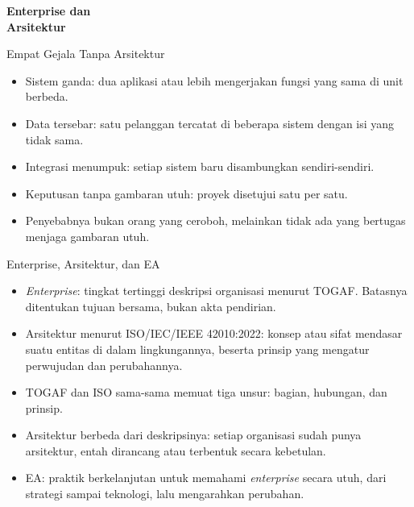 \documentclass[aspectratio=169, table, 12pt]{beamer}
\begin{document}
\begin{frame}{\hfill}
  \centering
  \Huge{\textbf{Enterprise dan\\Arsitektur}}
\end{frame}

\begin{frame}{{\Large Empat Gejala Tanpa Arsitektur}}
  \vspace{10pt}
  \begin{itemize}
    \item Sistem ganda: dua aplikasi atau lebih mengerjakan fungsi yang sama di unit berbeda.
    \item Data tersebar: satu pelanggan tercatat di beberapa sistem dengan isi yang tidak sama.
    \item Integrasi menumpuk: setiap sistem baru disambungkan sendiri-sendiri.
    \item Keputusan tanpa gambaran utuh: proyek disetujui satu per satu.
    \item Penyebabnya bukan orang yang ceroboh, melainkan tidak ada yang bertugas menjaga gambaran
          utuh.
  \end{itemize}
\end{frame}

\begin{frame}{{\Large Enterprise, Arsitektur, dan EA}}
  \vspace{6pt}
  \small
  \begin{itemize}
    \item \textit{Enterprise}: tingkat tertinggi deskripsi organisasi menurut TOGAF. Batasnya
          ditentukan tujuan bersama, bukan akta pendirian.
    \item Arsitektur menurut ISO/IEC/IEEE 42010:2022: konsep atau sifat mendasar suatu entitas di
          dalam lingkungannya, beserta prinsip yang mengatur perwujudan dan perubahannya.
    \item TOGAF dan ISO sama-sama memuat tiga unsur: bagian, hubungan, dan prinsip.
    \item Arsitektur berbeda dari deskripsinya: setiap organisasi sudah punya arsitektur, entah
          dirancang atau terbentuk secara kebetulan.
    \item EA: praktik berkelanjutan untuk memahami \textit{enterprise} secara utuh, dari strategi
          sampai teknologi, lalu mengarahkan perubahan.
  \end{itemize}
\end{frame}
\end{document}
